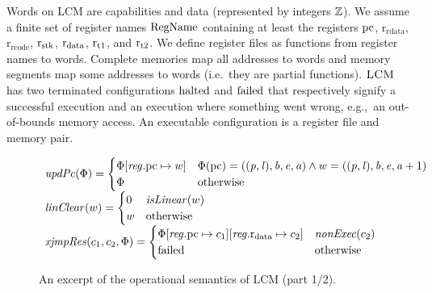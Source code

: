 \documentclass{jfp}
\renewcommand{\RegName}{\shareddom{RegName}}
\renewcommand{\decInstr}[1]{\plainfun{decode}{#1}}
\renewcommand{\updPcAddr}[1]{\plainfun{updPc}{#1}}
\renewcommand{\linCons}[1]{\plainfun{linClear}{#1}}
\renewcommand{\nonExec}[1]{\plainfun{nonExec}{#1}}
\renewcommand{\perm}{\var{p}}
\renewcommand{\rretc}{\mathrm{r}_{\mathrm{rcode}}}
\renewcommand{\rretd}{\mathrm{r}_{\mathrm{rdata}}}
\newcommand{\xjmpres}[1]{\plainfun{xjmpRes}{#1}}
\newcommand{\trgcm}{\textsc{LCM}}
\begin{document}
Words on \trgcm{} are capabilities and data (represented by integers $\mathbb{Z}$).
We assume a finite set of register names $\RegName$ containing at least the registers $\mathrm{pc}$, $\rretd$, $\rretc$, $\mathrm{r}_\mathrm{stk}$, $\mathrm{r}_\mathrm{data}$, $\mathrm{r}_\mathrm{t1}$, and $\mathrm{r}_\mathrm{t2}$.
We define register files as functions from register names to words.
Complete memories map all addresses to words and memory segments map some addresses to words (i.e.\ they are partial functions).
$\trgcm{}$ has two terminated configurations $\mathrm{halted}$ and $\mathrm{failed}$ that respectively signify a successful execution and an execution where something went wrong, e.g.,\ an out-of-bounds memory access.
An executable configuration is a register file and memory pair.

\begin{figure}
  \centering
  \[
    \begin{array}{l}
  \updPcAddr{\Phi} =
  \begin{cases}
    \Phi\updReg{\pcreg}{w} & \Phi(\pcreg) = ((\perm,\lin),\baddr,\eaddr,\aaddr) \wedge w = ((\perm,\lin),\baddr,\eaddr,\aaddr+1)\\
    \Phi  & \totherwise
  \end{cases}\\
  \linCons{w} =
  \begin{cases}
    0 & \isLinear{w} \\
    w & \totherwise
  \end{cases}\\
  \xjmpres{c_1,c_2,\Phi} =
  \begin{cases}
    \Phi\updReg{\pcreg}{c_1}\updReg{\rdata}{c_2} & \nonExec{c_2} \\
    \failed & \totherwise
  \end{cases}
  \end{array}
\]
\caption{An excerpt of the operational semantics of \trgcm{} (part 1/2).}
\label{fig:target-op-sem1}
\end{figure}
\end{document}
